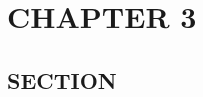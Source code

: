 \documentclass[../main/main]{subfiles}
\begin{document}
\chapter{CHAPTER 3}

\section{SECTION}

\printbibliography
\end{document}
